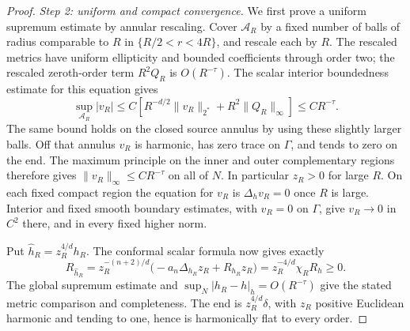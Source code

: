 \begin{proof}
\smallskip\noindent\emph{Step 2: uniform and compact convergence.}
We first prove a uniform supremum estimate by annular rescaling. Cover \(\mathcal A_R\) by a fixed number of balls of
radius comparable to \(R\) in
\(\{R/2<r<4R\}\), and rescale each by \(R\). The rescaled metrics
have uniform ellipticity and bounded coefficients through order two;
the rescaled zeroth-order term \(R^2Q_R\) is \(O(R^{-\tau})\).
The scalar interior boundedness estimate for this equation gives
\[
 \sup_{\mathcal A_R}|v_R|
 \le C\left[
 R^{-d/2}\|v_R\|_{2^*}
       +R^2\|Q_R\|_\infty\right]
 \le C R^{-\tau}.
\]
The same bound holds on the closed source annulus by using these
slightly larger balls. Off that annulus \(v_R\) is harmonic, has
zero trace on \(\Gamma\), and tends to zero on the end. The maximum
principle on the inner and outer complementary regions therefore
gives \(\|v_R\|_\infty\le CR^{-\tau}\) on all of \(N\).
In particular \(z_R>0\) for large \(R\).
On each fixed compact region the equation for \(v_R\) is
\(\Delta_hv_R=0\) once \(R\) is large. Interior and fixed smooth
boundary estimates, with \(v_R=0\) on \(\Gamma\), give
\(v_R\to0\) in \(C^2\) there, and in every fixed higher norm.

Put \(\widehat h_R=z_R^{4/d}h_R\). The conformal scalar formula
now gives exactly
\[
 R_{\widehat h_R}
 =z_R^{-(n+2)/d}
       \bigl(-a_n\Delta_{h_R}z_R+R_{h_R}z_R\bigr)
 =z_R^{-4/d}\chi_R R_h\ge0.
\]
The global supremum estimate and
\(\sup_N|h_R-h|_h=O(R^{-\tau})\) give the stated metric comparison
and completeness. The end is \(z_R^{4/d}\delta\), with \(z_R\)
positive Euclidean harmonic and tending to one, hence is
harmonically flat to every order.


\end{proof}
